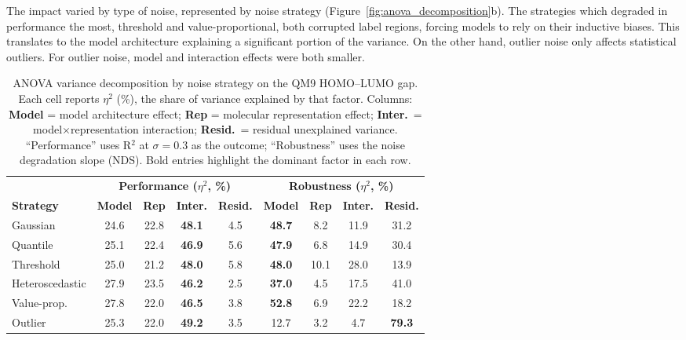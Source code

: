 The impact varied by type of noise, represented by noise strategy (Figure~\ref{fig:anova_decomposition}b). The strategies which degraded in performance the most, threshold and value-proportional, both corrupted label regions, forcing models to rely on their inductive biases. This translates to the model architecture explaining a significant portion of the variance. On the other hand, outlier noise only affects statistical outliers. For outlier noise, model and interaction effects were both smaller.

\begin{table}[htbp]
\centering
\caption{ANOVA variance decomposition by noise strategy on the QM9 HOMO--LUMO gap. Each cell reports $\eta^2$ (\%), the share of variance explained by that factor. Columns: \textbf{Model} = model architecture effect; \textbf{Rep} = molecular representation effect; \textbf{Inter.}\ = model$\times$representation interaction; \textbf{Resid.}\ = residual unexplained variance. ``Performance'' uses R$^2$ at $\sigma = 0.3$ as the outcome; ``Robustness'' uses the noise degradation slope (NDS). Bold entries highlight the dominant factor in each row.}
\label{tab:anova_decomposition}
\small
\begin{tabular}{lcccccccc}
\toprule
& \multicolumn{4}{c}{\textbf{Performance ($\eta^2$, \%)}} & \multicolumn{4}{c}{\textbf{Robustness ($\eta^2$, \%)}} \\
\cmidrule(lr){2-5} \cmidrule(lr){6-9}
\textbf{Strategy} & \textbf{Model} & \textbf{Rep} & \textbf{Inter.} & \textbf{Resid.} & \textbf{Model} & \textbf{Rep} & \textbf{Inter.} & \textbf{Resid.} \\
\midrule
Gaussian        & 24.6 & 22.8 & \textbf{48.1} &  4.5 & \textbf{48.7} &  8.2 & 11.9 & 31.2 \\
Quantile        & 25.1 & 22.4 & \textbf{46.9} &  5.6 & \textbf{47.9} &  6.8 & 14.9 & 30.4 \\
Threshold       & 25.0 & 21.2 & \textbf{48.0} &  5.8 & \textbf{48.0} & 10.1 & 28.0 & 13.9 \\
Heteroscedastic & 27.9 & 23.5 & \textbf{46.2} &  2.5 & \textbf{37.0} &  4.5 & 17.5 & 41.0 \\
Value-prop.     & 27.8 & 22.0 & \textbf{46.5} &  3.8 & \textbf{52.8} &  6.9 & 22.2 & 18.2 \\
Outlier         & 25.3 & 22.0 & \textbf{49.2} &  3.5 & 12.7 &  3.2 &  4.7 & \textbf{79.3} \\
\bottomrule
\end{tabular}
\end{table}

